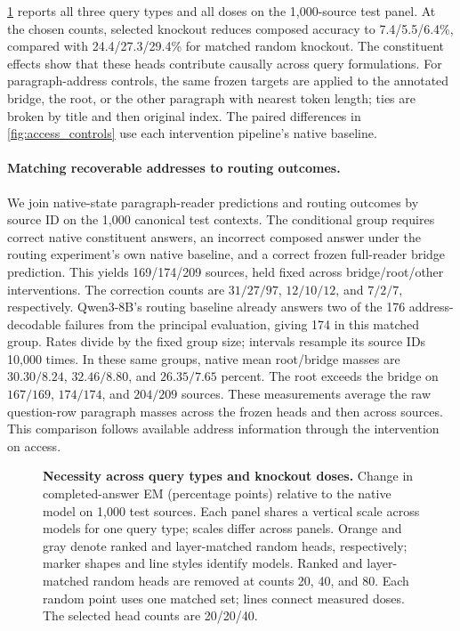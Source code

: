 \cref{fig:necessity} reports all three query types and all doses on the 1,000-source test panel. At the chosen counts, selected knockout reduces composed accuracy to 7.4/5.5/6.4\%, compared with 24.4/27.3/29.4\% for matched random knockout. The constituent effects show that these heads contribute causally across query formulations. For paragraph-address controls, the same frozen targets are applied to the annotated bridge, the root, or the other paragraph with nearest token length; ties are broken by title and then original index. The paired differences in \cref{fig:access_controls} use each intervention pipeline's native baseline.

\paragraph{Matching recoverable addresses to routing outcomes.} We join native-state paragraph-reader predictions and routing outcomes by source ID on the 1,000 canonical test contexts. The conditional group requires correct native constituent answers, an incorrect composed answer under the routing experiment's own native baseline, and a correct frozen full-reader bridge prediction. This yields 169/174/209 sources, held fixed across bridge/root/other interventions. The correction counts are $31/27/97$, $12/10/12$, and $7/2/7$, respectively. Qwen3-8B's routing baseline already answers two of the 176 address-decodable failures from the principal evaluation, giving 174 in this matched group. Rates divide by the fixed group size; intervals resample its source IDs 10,000 times. In these same groups, native mean root/bridge masses are $30.30/8.24$, $32.46/8.80$, and $26.35/7.65$ percent. The root exceeds the bridge on $167/169$, $174/174$, and $204/209$ sources. These measurements average the raw question-row paragraph masses across the frozen heads and then across sources. This comparison follows available address information through the intervention on access.


\begin{figure}[!htbp]
  \centering
  \begin{minipage}{1\textwidth}\centering
  \par
  \caption{\textbf{Necessity across query types and knockout doses.} Change in completed-answer EM (percentage points) relative to the native model on 1,000 test sources. Each panel shares a vertical scale across models for one query type; scales differ across panels. Orange and gray denote ranked and layer-matched random heads, respectively; marker shapes and line styles identify models. Ranked and layer-matched random heads are removed at counts 20, 40, and 80. Each random point uses one matched set; lines connect measured doses. The selected head counts are 20/20/40.}
  \label{fig:necessity}
\end{minipage}
\end{figure}


